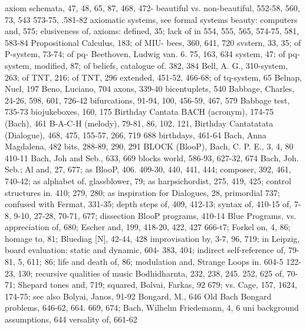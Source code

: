 axiom schemata, 47, 48, 65, 87, 468, 472-      beautiful vs. non-beautiful, 552-58, 560,
73, 543                                        573-75, .581-82
axiomatic systems, see formal systems          beauty: computers and, 575; elusiveness of,
axioms: defined, 35; lack of in                554, 555, 565, 574-75, 581, 583-84
Propositional Calculus, 183; of MIU-           bees, 360, 641, 720
svstern, 33, 35; of P-system, 73-74; of pq-    Beethoven, Ludwig van. 6. 75, 163, 634
system, 47; of pq-system, modified, 87; of     beliefs, catalogue of. 382, 384 Bell, A. G.,
310-system, 263; of TNT, 216; of TNT,          296
extended, 451-52, 466-68; of tq-system, 65     Belnap, Nuel, 197 Beno, Luciano, 704
axons, 339-40                                  bicentuplets, 540
Babbage, Charles, 24-26, 598, 601, 726-42      bifurcations, 91-94, 100, 456-59, 467, 579
Babbage test, 735-73                           biojukeboxes, 160, 175 Birthday Cantata
BACH (acronym), 174-75                         (Bach), 461
B-A-C-H (melody), 79-81, 86, 102, 121,         Birthday Cantatatata (Dialogue), 468, 475,
155-57, 266, 719                               688 birthdays, 461-64
Bach, Anna Magdalena, 482                      bits, 288-89, 290, 291 BLOCK (BlooP),
Bach, C. P. E., 3, 4, 80                       410-11
Bach, Joh and Seb., 633, 669                   blocks world, 586-93, 627-32, 674
Bach, Joh. Seb.; Al and, 27, 677; as           BlooP, 406. 409-30, 440, 441, 444;
composer, 392, 461, 740-42; as                 alphabet of,
glassblower, 79; as harpsichordist, 275,       419, 425; control structures in. 410;
279, 280; as inspiration for Dialogues, 28,    primordial
737; confused with Fermat, 331-35; depth       steps of, 409, 412-13; syntax of, 410-15
of, 7-8, 9-10, 27-28, 70-71, 677; dissection   BlooP programs, 410-14 Blue Programs,
vs. appreciation of, 680; Escher and, 199,     418-20, 422, 427
666-t7; Forkel on, 4, 86; homage to, 81;       Bluediag [N], 42-44, 428
improvisation by, 3-7, 96, 719; in Leipzig,    board evaluation: static and dynamic, 604-
383, 404; indirect self-reference of, 79-81,   5, 611;
86; life and death of, 86; modulation and,     Strange Loops in. 604-5
122-23, 130; recursive qualities of music      Bodhidharnta, 232, 238, 245. 252, 625
of, 70-71; Shepard tones and, 719; squared,    Bolvai, Farkas, 92
679; vs. Cage, 157, 1624, 174-75; see also     Bolyai, Janos, 91-92 Bongard, M., 646
Old Bach                                       Bongard problems, 646-62, 664. 669, 674;
Bach, Wilhelm Friedemann, 4, 6                 uni
background assumptions, 644                    versality of, 661-62
